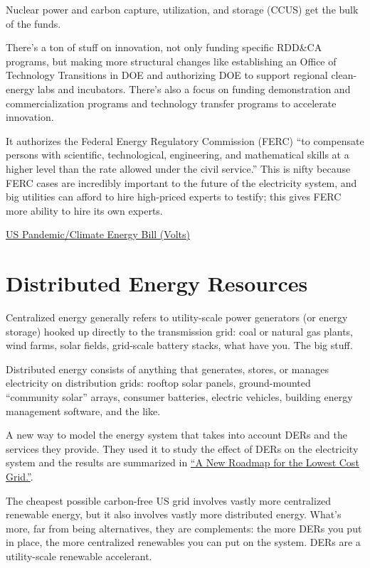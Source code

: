\documentclass[
]{book}
\begin{document}
Nuclear power and carbon capture, utilization, and storage (CCUS) get the bulk of the funds.

There's a ton of stuff on innovation, not only funding specific RDD\&CA programs, but making more structural changes like establishing an Office of Technology Transitions in DOE and authorizing DOE to support regional clean-energy labs and incubators. There's also a focus on funding demonstration and commercialization programs and technology transfer programs to accelerate innovation.

It authorizes the Federal Energy Regulatory Commission (FERC) ``to compensate persons with scientific, technological, engineering, and mathematical skills at a higher level than the rate allowed under the civil service.'' This is nifty because FERC cases are incredibly important to the future of the electricity system, and big utilities can afford to hire high-priced experts to testify; this gives FERC more ability to hire its own experts.

\href{https://www.volts.wtf/p/congress-might-pass-a-huge-energy}{US Pandemic/Climate Energy Bill (Volts)}

\hypertarget{distributed-energy-resources}{%
\chapter{Distributed Energy Resources}\label{distributed-energy-resources}}

Centralized energy generally refers to utility-scale power generators (or energy storage) hooked up directly to the transmission grid: coal or natural gas plants, wind farms, solar fields, grid-scale battery stacks, what have you. The big stuff.

Distributed energy consists of anything that generates, stores, or manages electricity on distribution grids: rooftop solar panels, ground-mounted ``community solar'' arrays, consumer batteries, electric vehicles, building energy management software, and the like.

A new way to model the energy system that takes into account DERs and the services they provide. They used it to study the effect of DERs on the electricity system and the results are summarized in \href{https://www.vibrantcleanenergy.com/wp-content/uploads/2020/12/WhyDERs_ES_Final.pdf}{``A New Roadmap for the Lowest Cost Grid.''}.

The cheapest possible carbon-free US grid involves vastly more centralized renewable energy, but it also involves vastly more distributed energy. What's more, far from being alternatives, they are complements: the more DERs you put in place, the more centralized renewables you can put on the system. DERs are a utility-scale renewable accelerant.
\end{document}
